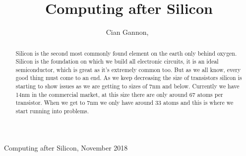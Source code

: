 \documentclass[journal]{IEEEtran}
\begin{document}
%
{Computing after Silicon, November 2018}

\title{Computing after Silicon}
\author{Cian Gannon,~}

\maketitle

\begin{abstract}

Silicon is the second most commonly found element on the earth only behind oxygen. Silicon is the foundation on which we build all electronic circuits, it is an ideal semiconductor, which is great as it's extremely common too. But as we all know, every good thing must come to an end. As we keep decreasing the size of transistors silicon is starting to show issues as we are getting to sizes of 7nm and below. Currently we have 14nm in the commercial market, at this size there are only around 67 atoms per  transistor. When we get to 7nm we only have around 33 atoms and this is where we start running into problems.

\end{abstract}
\end{document}
